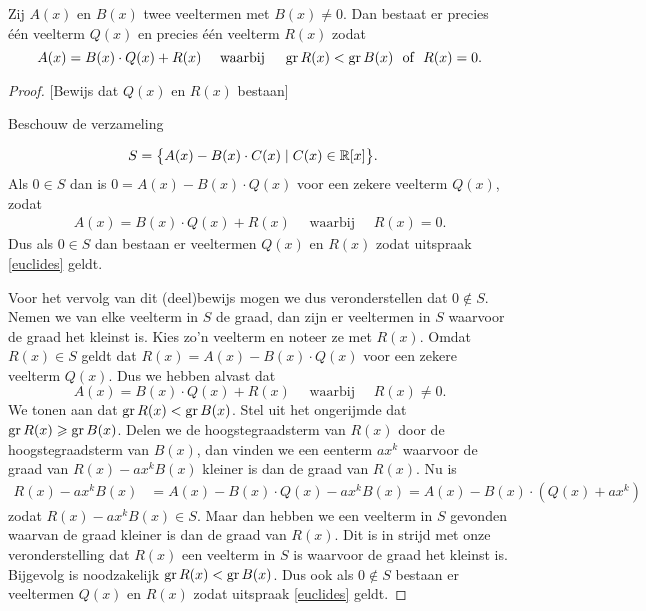\documentclass{ximera}
\begin{document}
	\begin{theorem} 
	Zij $A(x)$ en $B(x)$ twee veeltermen met $B(x) \neq 0$. Dan bestaat er precies \'e\'en veelterm $Q(x)$ en precies \'e\'en veelterm $R(x)$ zodat
	\begin{equation} \label{euclides}
	A(x) = B(x)\cdot Q(x) + R(x) \quad \text{ waarbij } \quad \operatorname{gr} R(x) < \operatorname{gr} B(x) \,\, \text{ of } \,\, R(x) = 0.
	\end{equation}
	\end{theorem} 
	\begin{Uitbreiding}
	
	  
	\begin{proof}
	  
	  
	  
	[Bewijs dat $Q(x)$ en $R(x)$ bestaan] 
	  
	Beschouw de verzameling 
	
	\begin{align*}
	S & = \bigl\{ A(x) - B(x)\cdot C(x) \mid C(x) \in \mathbb{R}[x] \bigr\}.  
	\end{align*}
	Als $0 \in S$ dan is $0 = A(x) - B(x)\cdot Q(x)$ voor een zekere veelterm $Q(x)$, zodat \begin{align*}
	A(x) = B(x)\cdot Q(x) + R(x) \quad \text{ waarbij } \quad R(x) = 0.
	\end{align*}
	Dus als $0 \in S$ dan bestaan er veeltermen $Q(x)$ en $R(x)$ zodat uitspraak \eqref{euclides} geldt. 
	
	Voor het vervolg van dit (deel)bewijs mogen we dus veronderstellen dat $0 \not\in S$. Nemen we van elke veelterm in $S$ de graad, dan zijn er veeltermen in $S$ waarvoor de graad het kleinst is. Kies zo'n veelterm en noteer ze met $R(x)$. Omdat $R(x) \in S$ geldt dat $R(x) = A(x) - B(x)\cdot Q(x)$ voor een zekere veelterm $Q(x)$. Dus we hebben alvast dat
	\[
	A(x) = B(x)\cdot Q(x) + R(x) \quad \text{ waarbij } \quad R(x) \neq 0.
	\]
	We tonen aan dat $\operatorname{gr} R(x) < \operatorname{gr} B(x)$. Stel uit het ongerijmde dat $\operatorname{gr} R(x) \geqslant \operatorname{gr} B(x)$. Delen we de hoogstegraadsterm van $R(x)$ door de hoogstegraadsterm van $B(x)$, dan vinden we een eenterm $ax^k$ waarvoor de graad van $R(x) - ax^k B(x)$ kleiner is dan de graad van $R(x)$. Nu is
	\begin{align*}
	R(x) - ax^k B(x) & = A(x) - B(x)\cdot Q(x) - ax^k B(x) = A(x) - B(x)\cdot (Q(x) + ax^k) 
	\end{align*}
	zodat $R(x) - ax^k B(x) \in S$. Maar dan hebben we een veelterm in $S$ gevonden waarvan de graad kleiner is dan de graad van $R(x)$. Dit is in strijd  met onze veronderstelling dat $R(x)$ een veelterm in $S$ is waarvoor de graad het kleinst is. Bijgevolg is noodzakelijk $\operatorname{gr} R(x) < \operatorname{gr} B(x)$. Dus ook als $0 \not\in S$ bestaan er veeltermen $Q(x)$ en $R(x)$ zodat uitspraak \eqref{euclides} geldt.
	
	\end{proof}
	
	\end{Uitbreiding}
	
\end{document}
